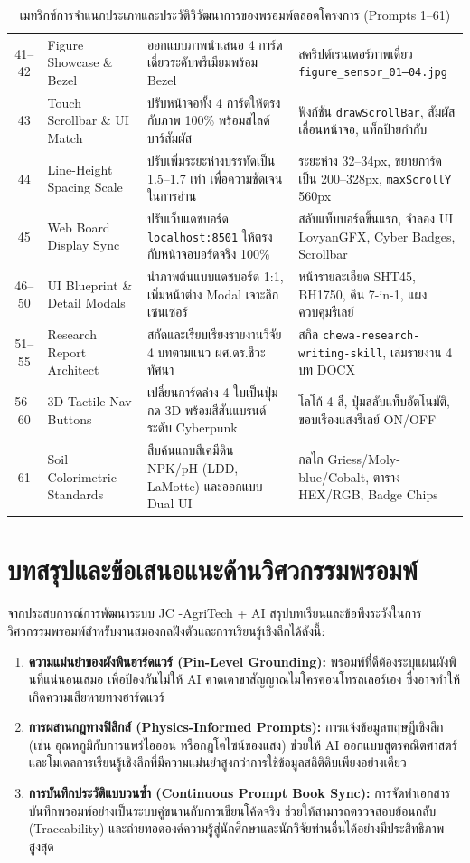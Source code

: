 \begin{table}[htbp]
\begin{tabularx}{\textwidth}{c p{3.0cm} p{5.5cm} Y}
41--42 & Figure Showcase \& Bezel & ออกแบบภาพนำเสนอ 4 การ์ดเดี่ยวระดับพรีเมียมพร้อม Bezel & สคริปต์เรนเดอร์ภาพเดี่ยว \texttt{figure\_sensor\_01--04.jpg} \\
43 & Touch Scrollbar \& UI Match & ปรับหน้าจอทั้ง 4 การ์ดให้ตรงกับภาพ 100\% พร้อมสไลด์บาร์สัมผัส & ฟังก์ชัน \texttt{drawScrollBar}, สัมผัสเลื่อนหน้าจอ, แท็กป้ายกำกับ \\
44 & Line-Height Spacing Scale & ปรับเพิ่มระยะห่างบรรทัดเป็น 1.5--1.7 เท่า เพื่อความชัดเจนในการอ่าน & ระยะห่าง 32--34px, ขยายการ์ดเป็น 200--328px, \texttt{maxScrollY} 560px \\
45 & Web Board Display Sync & ปรับเว็บแดชบอร์ด \texttt{localhost:8501} ให้ตรงกับหน้าจอบอร์ดจริง 100\% & สลับแท็บบอร์ดขึ้นแรก, จำลอง UI LovyanGFX, Cyber Badges, Scrollbar \\
46--50 & UI Blueprint \& Detail Modals & นำภาพต้นแบบแดชบอร์ด 1:1, เพิ่มหน้าต่าง Modal เจาะลึกเซนเซอร์ & หน้ารายละเอียด SHT45, BH1750, ดิน 7-in-1, แผงควบคุมรีเลย์ \\
51--55 & Research Report Architect & สกัดและเรียบเรียงรายงานวิจัย 4 บทตามแนว ผศ.ดร.ชีวะ ทัศนา & สกิล \texttt{chewa-research-writing-skill}, เล่มรายงาน 4 บท DOCX \\
56--60 & 3D Tactile Nav Buttons & เปลี่ยนการ์ดล่าง 4 ใบเป็นปุ่มกด 3D พร้อมสีสันแบรนด์ระดับ Cyberpunk & โลโก้ 4 สี, ปุ่มสลับแท็บอัตโนมัติ, ขอบเรืองแสงรีเลย์ ON/OFF \\
61 & Soil Colorimetric Standards & สืบค้นแถบสีเคมีดิน NPK/pH (LDD, LaMotte) และออกแบบ Dual UI & กลไก Griess/Moly-blue/Cobalt, ตาราง HEX/RGB, Badge Chips \\
\bottomrule
\end{tabularx}
\caption{เมทริกซ์การจำแนกประเภทและประวัติวิวัฒนาการของพรอมพ์ตลอดโครงการ (Prompts 1--61)}
\label{tab:prompt_trajectory_matrix}
\end{table}


\section{บทสรุปและข้อเสนอแนะด้านวิศวกรรมพรอมพ์}

จากประสบการณ์การพัฒนาระบบ JC -AgriTech + AI สรุปบทเรียนและข้อพึงระวังในการวิศวกรรมพรอมพ์สำหรับงานสมองกลฝังตัวและการเรียนรู้เชิงลึกได้ดังนี้:
\begin{enumerate}
    \item \textbf{ความแม่นยำของผังพินฮาร์ดแวร์ (Pin-Level Grounding):} พรอมพ์ที่ดีต้องระบุแผนผังพินที่แน่นอนเสมอ เพื่อป้องกันไม่ให้ AI คาดเดาขาสัญญาณไมโครคอนโทรลเลอร์เอง ซึ่งอาจทำให้เกิดความเสียหายทางฮาร์ดแวร์
    \item \textbf{การผสานกฎทางฟิสิกส์ (Physics-Informed Prompts):} การแจ้งข้อมูลทฤษฎีเชิงลึก (เช่น อุณหภูมิกับการแพร่ไอออน หรือกฎโคไซน์ของแสง) ช่วยให้ AI ออกแบบสูตรคณิตศาสตร์และโมเดลการเรียนรู้เชิงลึกที่มีความแม่นยำสูงกว่าการใช้ข้อมูลสถิติดิบเพียงอย่างเดียว
    \item \textbf{การบันทึกประวัติแบบวนซ้ำ (Continuous Prompt Book Sync):} การจัดทำเอกสารบันทึกพรอมพ์อย่างเป็นระบบคู่ขนานกับการเขียนโค้ดจริง ช่วยให้สามารถตรวจสอบย้อนกลับ (Traceability) และถ่ายทอดองค์ความรู้สู่นักศึกษาและนักวิจัยท่านอื่นได้อย่างมีประสิทธิภาพสูงสุด
\end{enumerate}
